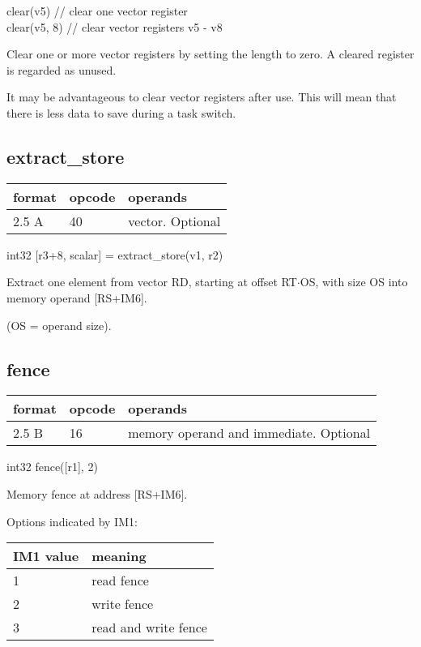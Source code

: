 \documentclass[forwardcom.tex]{subfiles}
\begin{document}
clear(v5)      // clear one vector register \\
clear(v5, 8)   // clear vector registers v5 - v8
\vv

Clear one or more vector registers by setting the length to zero. A cleared register is regarded as unused.
\vv

It may be advantageous to clear vector registers after use. This will mean that there is less data to save during a task switch.
\vv


\subsection{extract\_store}
\label{table:extractStoreInstruction}
\begin{tabular}{|p{12mm}|p{15mm}|p{100mm}|}
\hline
\bfseries format & \bfseries opcode & \bfseries operands \\ \hline
2.5 A & 40 & vector. Optional \\ \hline
\end{tabular}
\vv

int32 [r3+8, scalar] = extract\_store(v1, r2)
\vv

Extract one element from vector RD, starting at offset RT$\cdot$OS, with size OS into memory operand [RS+IM6].

(OS = operand size).


\subsection{fence}
\label{table:fenceInstruction}
\begin{tabular}{|p{12mm}|p{15mm}|p{100mm}|}
\hline
\bfseries format & \bfseries opcode & \bfseries operands \\ \hline
2.5 B & 16 & memory operand and immediate. Optional \\ \hline
\end{tabular}
\vv

int32   fence([r1], 2)
\vv

Memory fence at address [RS+IM6].
\vv

Options indicated by IM1:

\begin{longtable}{|p{20mm}|p{50mm}|}
\endfirsthead
\endhead
\hline
\bfseries IM1 value & \bfseries meaning \\ \hline
1 & read fence \\ \hline
2 & write fence \\ \hline
3 & read and write fence \\ \hline
\end{longtable}
\vv
\end{document}
